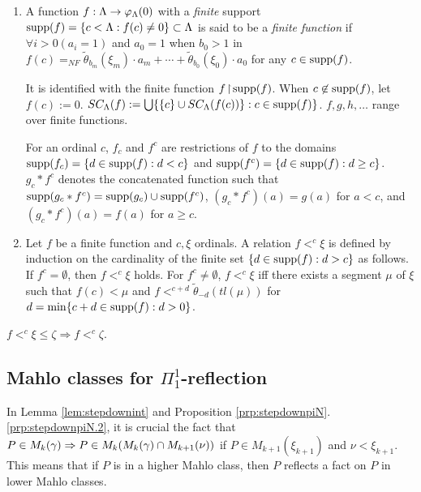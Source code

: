 \documentclass{article}
\begin{document}
\bdf\label{df:Lam3}
{\rm

  \begin{enumerate}
  \item
A function $f:\Lambda\to \varphi_{\Lambda}(0)$ with a \textit{finite} support
${\rm supp}(f)=\{c<\Lambda: f(c)\neq 0\}\subset \Lambda$ is said to be a \textit{finite function}
if
$\forall i>0(a_{i}=1)$ and $a_{0}=1$ when $b_{0}>1$
in
$f(c)=_{NF}\tilde{\theta}_{b_{m}}(\xi_{m})\cdot a_{m}+\cdots+\tilde{\theta}_{b_{0}}(\xi_{0})\cdot a_{0}$
for any $c\in{\rm supp}(f)$.

It is identified with the finite function $f\!\upharpoonright\! {\rm supp}(f)$.
When $c\not\in {\rm supp}(f)$, let $f(c):=0$.
$SC_{\Lambda}(f):=\bigcup\{\{c\}\cup SC_{\Lambda}(f(c))\}: c\in {\rm supp}(f)\}$.
$f,g,h,\ldots$ range over finite functions.

For an ordinal $c$, $f_{c}$ and $f^{c}$ are restrictions of $f$ to the domains
${\rm supp}(f_{c})=\{d\in{\rm supp}(f): d< c\}$ and ${\rm supp}(f^{c})=\{d\in{\rm supp}(f): d\geq c\}$.
$g_{c}*f^{c}$ denotes the concatenated function such that
${\rm supp}(g_{c}*f^{c})={\rm supp}(g_{c})\cup {\rm supp}(f^{c})$, 
$(g_{c}*f^{c})(a)=g(a)$ for $a<c$, and
$(g_{c}*f^{c})(a)=f(a)$ for $a\geq c$.




\item\label{df:Exp2.5}
Let $f$ be a finite function and $c,\xi$ ordinals.
A relation $f<^{c}\xi$ is defined by induction on the
cardinality of the finite set $\{d\in {\rm supp}(f): d>c\}$ as follows.
If $f^{c}=\emptyset$, then $f<^{c}\xi$ holds.
For $f^{c}\neq\emptyset$,
$f<^{c}\xi$ iff
there exists a segment $\mu$ of $\xi$ such that
$f(c)< \mu$
and 
$f<^{c+d} \tilde{\theta}_{-d}(tl(\mu))$ 
for $d=\min\{c+d\in {\rm supp}(f): d>0\}$.




\end{enumerate}

}
\edf


\bprp\label{prp:idless}
$f<^{c}\xi\leq\zeta \Rightarrow f<^{c}\zeta$.
\eprp

\subsection{Mahlo classes for $\Pi^{1}_{1}$-reflection}
In Lemma \ref{lem:stepdownint}  and Proposition \ref{prp:stepdownpiN}.\ref{prp:stepdownpiN.2},
it is crucial the fact that
$P\in M_{k}(\gamma) \Rightarrow P\in M_{k}(M_{k}(\gamma)\cap M_{k+1}(\nu))$ if
$P\in M_{k+1}(\xi_{k+1})$ and  $\nu<\xi_{k+1}$.
This means that if $P$ is in a higher Mahlo class, then $P$ reflects
a fact on $P$ in lower Mahlo classes.
\end{document}
